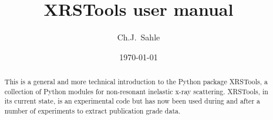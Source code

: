 \documentclass[aps,prl,groupedaddress]{revtex4}
\begin{document}

\title{XRSTools user manual}


\author{Ch.J.~Sahle}


\date{\today}

\begin{abstract}
This is a general and more technical introduction to the Python package XRSTools, a collection of Python modules for non-resonant inelastic x-ray scattering. XRSTools, in its current state, is an experimental code but has now been used during and after a number of experiments to extract publication grade data. 
\end{abstract}


\maketitle
\tableofcontents
\end{document}
